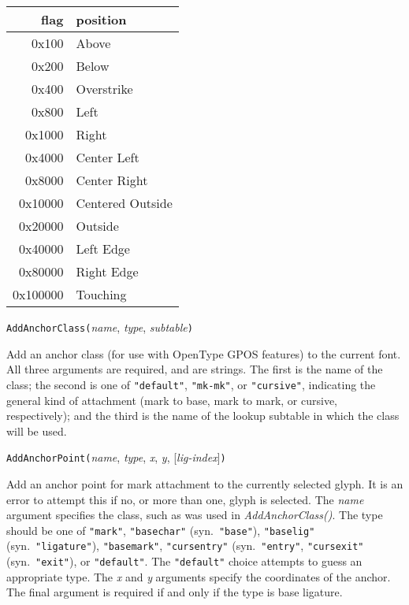 \begin{tabular}{r|l}
  flag & position \\ \hline
  0x100 & Above \\
  0x200 & Below \\
  0x400 & Overstrike \\
  0x800 & Left \\
  0x1000 & Right \\
  0x4000 & Center Left \\
  0x8000 & Center Right \\
  0x10000 & Centered Outside \\ 
  0x20000 & Outside \\
  0x40000 & Left Edge \\
  0x80000 & Right Edge \\
  0x100000  & Touching
\end{tabular}



\texttt{AddAnchorClass(}\textit{name}, \textit{type},
  \textit{subtable}\texttt{)}

Add an anchor class (for use with OpenType GPOS features) to the current
font.  All three arguments are required, and are strings.  The first is the
name of the class; the second is one of \texttt{"default"},
\texttt{"mk-mk"}, or \texttt{"cursive"}, indicating the general kind of
attachment (mark to base, mark to mark, or cursive, respectively); and the
third is the name of the lookup subtable in which the class will be used.



\texttt{AddAnchorPoint(}\textit{name}, \textit{type}, \textit{x},
  \textit{y}, [\textit{lig-index}]\texttt{)}

Add an anchor point for mark attachment to the currently selected glyph. 
It is an error to attempt this if no, or more than one, glyph is selected. 
The \textit{name} argument specifies the class, such as was used in
\textit{AddAnchorClass()}.  The type should be one of \texttt{"mark"},
\texttt{"basechar"} (syn.\ \texttt{"base"}), \texttt{"baselig"} (syn.\
\texttt{"ligature"}), \texttt{"basemark"}, \texttt{"cursentry"} (syn.\
\texttt{"entry"}, \texttt{"cursexit"} (syn.\ \texttt{"exit"}), or
\texttt{"default"}.  The \texttt{"default"} choice attempts to guess an
appropriate type.  The \textit{x} and \textit{y} arguments specify the
coordinates of the anchor.  The final argument is required if and only if
the type is base ligature.

